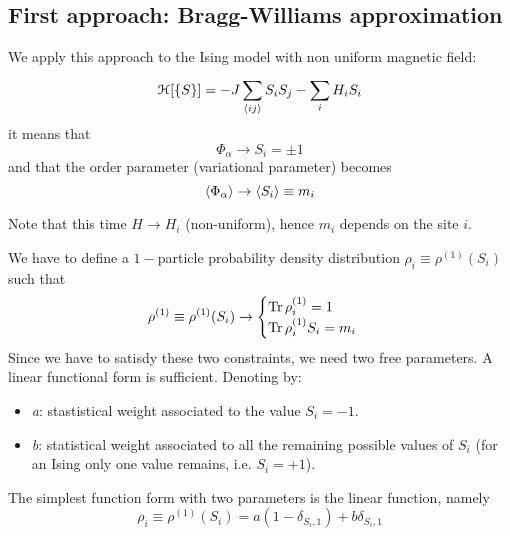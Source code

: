 \documentclass[../main/main.tex]{subfiles}
\begin{document}
\subsection{First approach: Bragg-Williams approximation}
We apply this approach to the Ising model with non uniform magnetic field:
\begin{equation}
  \mathcal{H} [\{ S \}  ] = - J \sum_{\expval{ij} }^{} S_i S_j - \sum_{i}^{} H_i S_i
\end{equation}
it means that
\begin{equation}
  \Phi _ \alpha \rightarrow S_i = \pm 1
\end{equation}
and that the order parameter (variational parameter) becomes
\begin{equation}
  \expval{\Phi _ \alpha } \rightarrow \expval{S_i}  \equiv m_i
\end{equation}
\begin{remark}
Note that this time \( H \rightarrow H_i \) (non-uniform), hence \( m_i \) depends on the site \( i \).
\end{remark}
We have to define a \( 1- \)particle probability density distribution \( \rho _i \equiv \rho ^{(1)} (S_i) \) such that
\begin{equation}
  \rho ^{(1)} \equiv \rho ^{(1)} (S_i) \rightarrow \begin{cases}
    \Tr \rho _i ^{(1)} = 1 \\
    \Tr \rho _i ^{(1)} S_i = m_i
\end{cases}
\end{equation}
Since we have to satisdy these two constraints, we need two free parameters. A linear functional form is sufficient. Denoting by:
\begin{itemize}
\item \emph{a}: stastistical weight associated to the value \( S_i =-1\).
\item \emph{b}: statistical weight associated to all the remaining possible values of \( S_i \) (for an Ising only one value remains, i.e. \( S_i = +1 \)).
\end{itemize}
The simplest function form with two parameters is the linear function, namely
\begin{equation}
  \rho _i \equiv \rho^{(1)} (S_i) = a (1- \delta _{S_i,1}) + b \delta _{S_i,1}
\end{equation}
\end{document}
